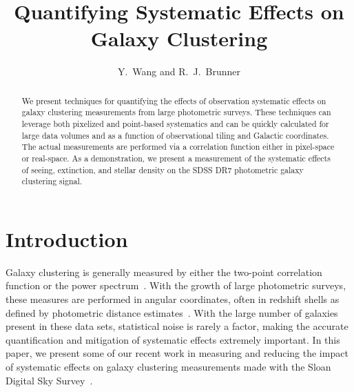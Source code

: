 
\resetcounters


\title{Quantifying Systematic Effects on Galaxy Clustering}
\author{Y.~Wang and R.~J.~Brunner \\
}


\begin{abstract}
We present techniques for quantifying the effects of observation systematic effects on galaxy clustering measurements from large photometric surveys. These techniques can leverage both pixelized and point-based systematics and can be quickly calculated for large data volumes and as a function of observational tiling and Galactic coordinates. The actual measurements are performed via a correlation function either in pixel-space or real-space. As a demonstration, we present a measurement of the systematic effects of seeing, extinction, and stellar density on the SDSS DR7 photometric galaxy clustering signal.
\end{abstract}


\section{Introduction}

Galaxy clustering is generally measured by either the two-point correlation function or the power spectrum~\citep[see, \textit{e.g.},][]{Peebles}.  With the growth of large photometric surveys, these measures are performed in angular coordinates, often in redshift shells as defined by photometric distance estimates~\citep[see, \textit{e.g.},][]{Ross07, Hayes13}. With the large number of galaxies present in these data sets, statistical noise is rarely a factor, making the accurate quantification and mitigation of systematic effects extremely important. In this paper, we present some of our recent work in measuring and reducing the impact of systematic effects on galaxy clustering measurements made with the Sloan Digital Sky Survey~\citep{York00}.

